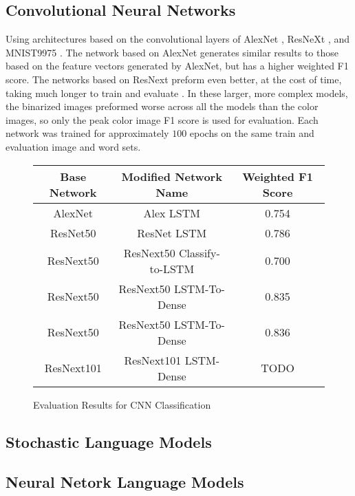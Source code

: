 \subsection{Convolutional Neural Networks}

Using architectures based on the convolutional layers of AlexNet \cite{Krizhevsky}, ResNeXt \cite{Xie}, and MNIST9975 \cite{Deotte}. The network based on AlexNet generates similar results to those based on the feature vectors generated by AlexNet, but has a higher weighted F1 score. The networks based on ResNext preform even better, at the cost of time, taking much longer to train and evaluate . In these larger, more complex models, the binarized images preformed worse across all the models than the color images, so only the peak color image F1 score is used for evaluation. Each network was trained for approximately $100$ epochs on the same train and evaluation image and word sets.

\begin{figure}[H]
    \caption{Evaluation Results for CNN Classification}
    \label{fig:classificationCNN}
    \centering
    \begin{tabular}{ | c | c | c | }
        \hline
        Base Network & Modified Network Name & Weighted F1 Score \\
        \hline
        AlexNet & Alex LSTM & 0.754 \\
        ResNet50 & ResNet LSTM & 0.786 \\
        ResNext50 & ResNext50 Classify-to-LSTM & 0.700 \\
        ResNext50 & ResNext50 LSTM-To-Dense & 0.835 \\
        ResNext50 & ResNext50 LSTM-To-Dense & 0.836 \\
        ResNext101 & ResNext101 LSTM-Dense & TODO \\
        \hline
    \end{tabular}
\end{figure}

\subsection{Stochastic Language Models}


\subsection{Neural Netork Language Models}

